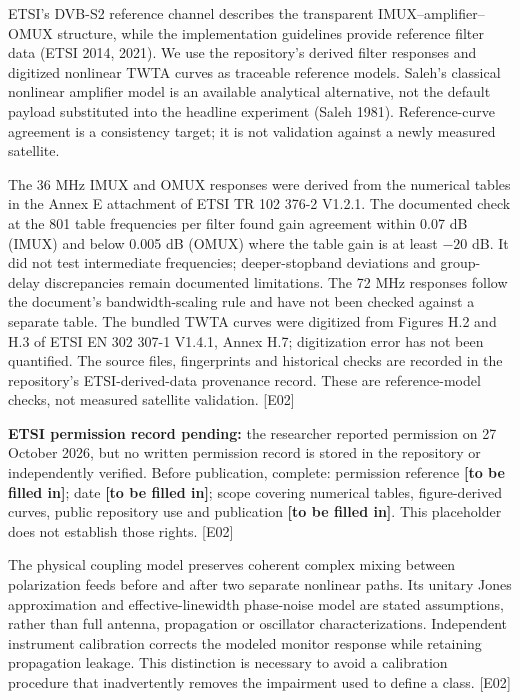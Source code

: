 \documentclass[
  10pt,
]{article}
\begin{document}
ETSI's DVB-S2 reference channel describes the transparent
IMUX--amplifier--OMUX structure, while the implementation guidelines
provide reference filter data (ETSI 2014, 2021). We use the repository's
derived filter responses and digitized nonlinear TWTA curves as
traceable reference models. Saleh's classical nonlinear amplifier model
is an available analytical alternative, not the default payload
substituted into the headline experiment (Saleh 1981). Reference-curve
agreement is a consistency target; it is not validation against a newly
measured satellite.

The 36 MHz IMUX and OMUX responses were derived from the numerical
tables in the Annex E attachment of ETSI TR 102 376-2 V1.2.1. The
documented check at the 801 table frequencies per filter found gain
agreement within 0.07 dB (IMUX) and below 0.005 dB (OMUX) where the
table gain is at least \(-20\) dB. It did not test intermediate
frequencies; deeper-stopband deviations and group-delay discrepancies
remain documented limitations. The 72 MHz responses follow the
document's bandwidth-scaling rule and have not been checked against a
separate table. The bundled TWTA curves were digitized from Figures H.2
and H.3 of ETSI EN 302 307-1 V1.4.1, Annex H.7; digitization error has
not been quantified. The source files, fingerprints and historical
checks are recorded in the repository's ETSI-derived-data provenance
record. These are reference-model checks, not measured satellite
validation. {[}E02{]}

\textbf{ETSI permission record pending:} the researcher reported
permission on 27 October 2026, but no written permission record is
stored in the repository or independently verified. Before publication,
complete: permission reference \textbf{{[}to be filled in{]}}; date
\textbf{{[}to be filled in{]}}; scope covering numerical tables,
figure-derived curves, public repository use and publication
\textbf{{[}to be filled in{]}}. This placeholder does not establish
those rights. {[}E02{]}

The physical coupling model preserves coherent complex mixing between
polarization feeds before and after two separate nonlinear paths. Its
unitary Jones approximation and effective-linewidth phase-noise model
are stated assumptions, rather than full antenna, propagation or
oscillator characterizations. Independent instrument calibration
corrects the modeled monitor response while retaining propagation
leakage. This distinction is necessary to avoid a calibration procedure
that inadvertently removes the impairment used to define a class.
{[}E02{]}
\end{document}
